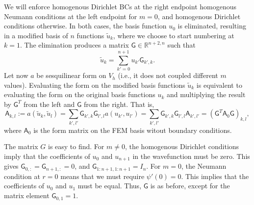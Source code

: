 \documentclass[12pt]{article}
\newcommand{\RR}{\mathbb{R}}
\begin{document}
We will enforce homogenous Dirichlet BCs at the right endpoint homogenous Neumann conditions at the left endpoint for $m=0$, and homogenous Dirichlet conditions otherwise. In both cases, the basis function $u_0$ is eliminated, resulting in a modified basis of $n$ functions $\tilde{u}_k$, where we choose to start numbering at $k=1$. The elimination produces a matrix $\mathsf{G} \in \RR^{n+2,n}$ such that
\begin{equation}
    \tilde{u}_k = \sum_{k'=0}^{n+1} u_{k'} \mathsf{G}_{k',k} .
\end{equation}
Let now $a$ be sesquilinear form on $V_h$ (i.e., it does not coupled different $m$ values). Evaluating the form on the modified basis functions $\tilde{u}_k$ is equivalent to evaluating the form on the original basis functions $u_k$ and multiplying the result by $\mathsf{G}^T$ from the left and $\mathsf{G}$ from the right. That is,
\begin{equation}
    \mathsf{A}_{k,l} := a(\tilde{u}_k, \tilde{u}_l) = \sum_{k',l'} \mathsf{G}_{k',k} \mathsf{G}_{l',l} a(u_{k'}, u_{l'}) = \sum_{k',l'} \mathsf{G}_{k',k} \mathsf{G}_{l',l} \mathsf{A}_{k',l'} = (\mathsf{G}^T \mathsf{A}_0 \mathsf{G})_{k,l},
\end{equation}
where $\mathsf{A}_0$ is the form matrix on the FEM basis witout boundary conditions. 

The matrix $G$ is easy to find. For $m\neq 0$, the homogenous Dirichlet conditions imply that the coefficients of $u_0$ and $u_{n+1}$ in the wavefunction must be zero. This gives $\mathsf{G}_{0,:} = \mathsf{G}_{n+1,:} = 0$, and $\mathsf{G}_{1:n+1, 1:n+1} = I_n$. For $m=0$, the Neumann condition at $r=0$ means that we must require $\psi'(0) = 0$. This implies that the coefficients of $u_0$ and $u_1$ must be equal. Thus, $\mathsf{G}$ is as before, except for the matrix element $\mathsf{G}_{0,1} = 1$.
\end{document}
